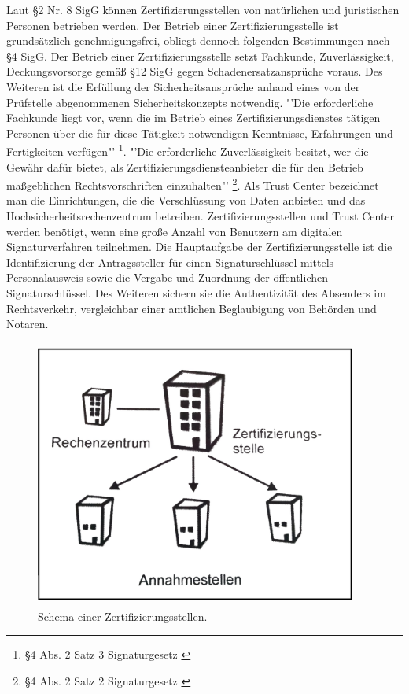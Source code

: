 Laut \S 2 Nr. 8 SigG können Zertifizierungsstellen von natürlichen und juristischen Personen betrieben werden. Der Betrieb einer Zertifizierungsstelle ist grundsätzlich genehmigungsfrei, obliegt dennoch folgenden Bestimmungen nach \S 4 SigG. Der Betrieb einer Zertifizierungsstelle setzt Fachkunde, Zuverlässigkeit, Deckungsvorsorge gemäß \S 12 SigG gegen Schadenersatzansprüche voraus. Des Weiteren ist die Erfüllung der Sicherheitsansprüche anhand eines von der Prüfstelle abgenommenen Sicherheitskonzepts notwendig. "'Die erforderliche Fachkunde liegt vor, wenn die im Betrieb eines Zertifizierungsdienstes tätigen Personen über die für diese Tätigkeit notwendigen Kenntnisse, Erfahrungen und Fertigkeiten verfügen"' \footnote{\S 4 Abs. 2 Satz 3 Signaturgesetz \cite{grundlagenFN2}}. "'Die erforderliche Zuverlässigkeit besitzt, wer die Gewähr dafür bietet, als Zertifizierungsdiensteanbieter die für den Betrieb maßgeblichen Rechtsvorschriften einzuhalten"' \footnote{\S 4 Abs. 2 Satz 2 Signaturgesetz \cite{grundlagenFN2}}. Als Trust Center bezeichnet man die Einrichtungen, die die Verschlüssung von Daten anbieten und das Hochsicherheitsrechenzentrum betreiben. Zertifizierungsstellen und Trust Center werden benötigt, wenn eine große Anzahl von Benutzern am digitalen Signaturverfahren teilnehmen. Die Hauptaufgabe der Zertifizierungsstelle ist die Identifizierung der Antragssteller für einen Signaturschlüssel mittels Personalausweis sowie die Vergabe und Zuordnung der öffentlichen Signaturschlüssel. Des Weiteren sichern sie die Authentizität des Absenders im Rechtsverkehr, vergleichbar einer amtlichen Beglaubigung von Behörden und Notaren. \cite{standdeswissens3}\cite{zertstelle1} 
\begin{figure}[!ht]
    \centering
    \includegraphics[height=250pt, width=300pt]{trustcenterNeu3.jpg}
    \caption[Schema einer Zertifizierungsstellen]{\small{Schema einer Zertifizierungsstellen. \cite{trust1}}}
\end{figure}
